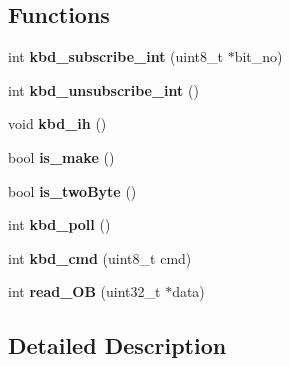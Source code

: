 \subsection*{Functions}
\begin{DoxyCompactItemize}
\item 
\mbox{\label{group__KBD_gaa7a491d4d95eab5ca5326c4000ad67f8}} 
int {\bfseries kbd\+\_\+subscribe\+\_\+int} (uint8\+\_\+t $\ast$bit\+\_\+no)
\item 
\mbox{\label{group__KBD_ga5bdf6cfb570c375192b0d87913b65c57}} 
int {\bfseries kbd\+\_\+unsubscribe\+\_\+int} ()
\item 
\mbox{\label{group__KBD_ga3b35eecf289446fe614818dd6ab6d5bf}} 
void {\bfseries kbd\+\_\+ih} ()
\item 
\mbox{\label{group__KBD_ga51a9c9a831079b646a811655d72eb557}} 
bool {\bfseries is\+\_\+make} ()
\item 
\mbox{\label{group__KBD_ga1b3dfb34ed6e6aa3de57efe79db9938d}} 
bool {\bfseries is\+\_\+two\+Byte} ()
\item 
\mbox{\label{group__KBD_gac672a53152b4d9ddb00e9ccbceed40f6}} 
int {\bfseries kbd\+\_\+poll} ()
\item 
\mbox{\label{group__KBD_ga853e3c737bac28f5c6ebc68d0c114ac7}} 
int {\bfseries kbd\+\_\+cmd} (uint8\+\_\+t cmd)
\item 
\mbox{\label{group__KBD_ga4d852be328486a5598f26609603e3b3b}} 
int {\bfseries read\+\_\+\+OB} (uint32\+\_\+t $\ast$data)
\end{DoxyCompactItemize}


\subsection{Detailed Description}
